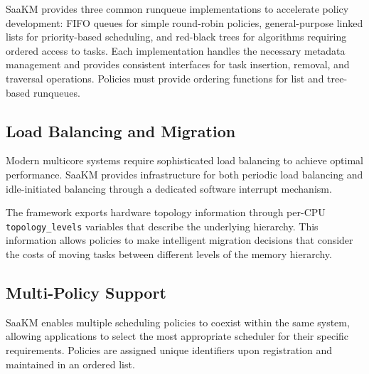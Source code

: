 SaaKM provides three common runqueue implementations to accelerate policy development: FIFO queues for simple round-robin policies, general-purpose linked lists for priority-based scheduling, and red-black trees for algorithms requiring ordered access to tasks. Each implementation handles the necessary metadata management and provides consistent interfaces for task insertion, removal, and traversal operations. Policies must provide ordering functions for list and tree-based runqueues.


\subsection{Load Balancing and Migration}

Modern multicore systems require sophisticated load balancing to achieve optimal performance. SaaKM provides infrastructure for both periodic load balancing and idle-initiated balancing through a dedicated software interrupt mechanism.

\parspace
The framework exports hardware topology information through per-CPU \texttt{topology\_levels} variables that describe the underlying hierarchy. This information allows policies to make intelligent migration decisions that consider the costs of moving tasks between different levels of the memory hierarchy.

\parspace
{}

\subsection{Multi-Policy Support}

SaaKM enables multiple scheduling policies to coexist within the same system, allowing applications to select the most appropriate scheduler for their specific requirements. Policies are assigned unique identifiers upon registration and maintained in an ordered list.

